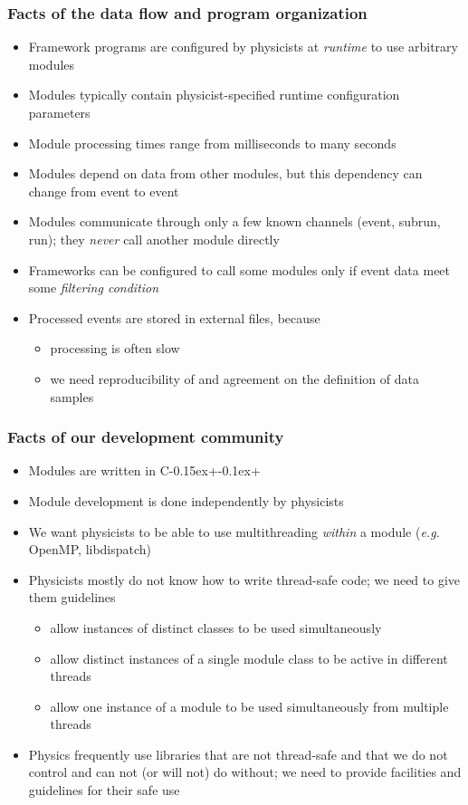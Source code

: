 \documentclass{beamer}
\newcommand{\cpp}{C\kern-0.15ex{+}\kern-0.1ex{+}\xspace}
\begin{document}
\begin{frame}
  \frametitle{Facts of the data flow and program organization}
  \begin{itemize}
    \item Framework programs are configured by physicists
          at \emph{runtime} to use
          arbitrary modules
    \item Modules typically contain physicist-specified
          runtime configuration parameters
    \item Module processing times range from milliseconds to many seconds
    \item Modules depend on data from other modules, but this dependency
          can change from event to event
    \item Modules communicate through only a few known channels (event,
          subrun, run); they \emph{never} call another module directly
    \item Frameworks can be configured to call some modules only if event
          data meet some \emph{filtering condition}
    \item Processed events are stored in external files, because
    \begin{itemize}
      \item processing is often slow
      \item we need reproducibility of and agreement on the definition of
            data samples
    \end{itemize}
  \end{itemize}
\end{frame}

\begin{frame}
  \frametitle{Facts of our development community}
  \begin{itemize}
    \item Modules are written in \cpp
    \item Module development is done independently by physicists
    \item We want physicists to be able to use multithreading \emph{within}
          a module (\textit{e.g.} OpenMP, libdispatch)
    \item Physicists mostly do not know how to write thread-safe code;
          we need to give them guidelines
    \begin{itemize}
      \item allow instances of distinct classes to be used simultaneously
      \item allow distinct instances of a single module class to be active
            in different threads
      \item allow one instance of a module to be used simultaneously from
            multiple threads
    \end{itemize}
    \item Physics frequently use libraries that are not thread-safe and that
          we do not control and can not (or will not) do without; we need
          to provide facilities and guidelines for their safe use
  \end{itemize}
\end{frame}
\end{document}

